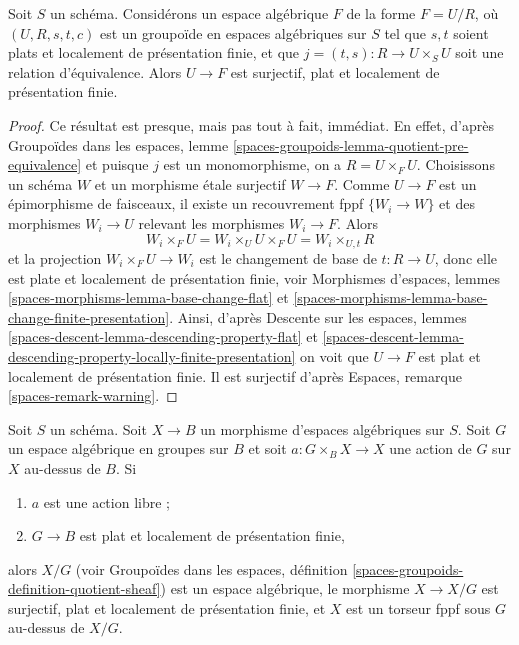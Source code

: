 \begin{lemma}
\label{lemma-covering-quotient}
Soit $S$ un schéma. Considérons un espace algébrique $F$ de la forme $F = U/R$,
où $(U, R, s, t, c)$ est un groupoïde en espaces algébriques
sur $S$ tel que $s, t$ soient plats et localement de présentation finie, et que
$j = (t, s) : R \to U \times_S U$ soit une relation d'équivalence.
Alors $U \to F$ est surjectif, plat et localement de présentation finie.
\end{lemma}

\begin{proof}
Ce résultat est presque, mais pas tout à fait, immédiat. En effet, d'après
Groupoïdes dans les espaces, lemme
\ref{spaces-groupoids-lemma-quotient-pre-equivalence}
et puisque $j$ est un monomorphisme, on a $R = U \times_F U$.
Choisissons un schéma $W$ et un morphisme étale surjectif $W \to F$.
Comme $U \to F$ est un épimorphisme de faisceaux, il existe un recouvrement fppf
$\{W_i \to W\}$ et des morphismes $W_i \to U$ relevant les morphismes $W_i \to F$.
Alors
$$
W_i \times_F U = W_i \times_U U \times_F U = W_i \times_{U, t} R
$$
et la projection $W_i \times_F U \to W_i$ est le changement de base de
$t : R \to U$, donc elle est plate et localement de présentation finie, voir
Morphismes d'espaces, lemmes
\ref{spaces-morphisms-lemma-base-change-flat} et
\ref{spaces-morphisms-lemma-base-change-finite-presentation}.
Ainsi, d'après
Descente sur les espaces, lemmes
\ref{spaces-descent-lemma-descending-property-flat} et
\ref{spaces-descent-lemma-descending-property-locally-finite-presentation}
on voit que $U \to F$ est plat et localement de présentation finie.
Il est surjectif d'après
Espaces, remarque \ref{spaces-remark-warning}.
\end{proof}

\begin{lemma}
\label{lemma-quotient-free-action}
Soit $S$ un schéma. Soit $X \to B$ un morphisme d'espaces algébriques sur
$S$. Soit $G$ un espace algébrique en groupes sur $B$ et soit
$a : G \times_B X \to X$ une action de $G$ sur $X$ au-dessus de $B$.
Si
\begin{enumerate}
\item $a$ est une action libre ;
\item $G \to B$ est plat et localement de présentation finie,
\end{enumerate}
alors $X/G$ (voir
Groupoïdes dans les espaces, définition
\ref{spaces-groupoids-definition-quotient-sheaf})
est un espace algébrique, le morphisme $X \to X/G$ est
surjectif, plat et localement de présentation finie, et
$X$ est un torseur fppf sous $G$ au-dessus de $X/G$.
\end{lemma}

